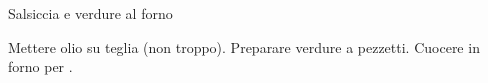 \begin{recipe}{Salsiccia e verdure al forno}
    \begin{header}

    \end{header}
    
    \begin{ingredients}
    \end{ingredients}
    
    \begin{preparation}
        \step Mettere olio su teglia (non troppo).
        \step Preparare verdure a pezzetti.
        \step Cuocere in forno per .
    \end{preparation}
\end{recipe}

